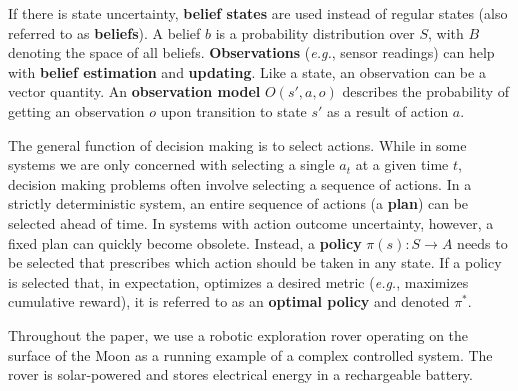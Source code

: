If there is state uncertainty, \textbf{belief states} are used instead of regular states (also referred to as \textbf{beliefs}). A belief $b$ is a probability distribution over $S$, with $B$ denoting the space of all beliefs. \textbf{Observations} (\textit{e.g.}, sensor readings) can help with \textbf{belief estimation} and \textbf{updating}. Like a state, an observation can be a vector quantity. An \textbf{observation model} $O(s',a,o)$ describes the probability of getting an observation $o$ upon transition to state $s'$ as a result of action $a$.

The general function of decision making is to select actions. While in some systems we are only concerned with selecting a single $a_t$ at a given time $t$, decision making problems often involve selecting a sequence of actions. In a strictly deterministic system, an entire sequence of actions (a \textbf{plan}) can be selected ahead of time. In systems with action outcome uncertainty, however, a fixed plan can quickly become obsolete. Instead, a \textbf{policy} $\pi(s): S \rightarrow A$ needs to be selected that prescribes which action should be taken in any state. If a policy is selected that, in expectation, optimizes a desired metric (\textit{e.g.}, maximizes cumulative reward), it is referred to as an \textbf{optimal policy} and denoted $\pi^*$.

Throughout the paper, we use a robotic exploration rover operating on the surface of the Moon as a running example of a complex controlled system. The rover is solar-powered and stores electrical energy in a rechargeable battery.
